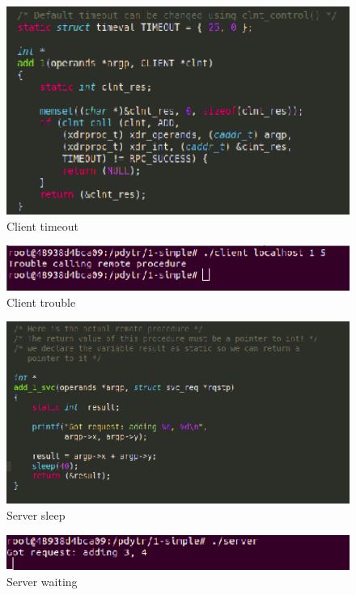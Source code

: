 \documentclass[12pt,journal,compsoc]{IEEEtran}
\begin{document}
\begin{figure}[H]
\centering
\includegraphics[width=125mm]{capturas/client-timeout.png}
\caption{Client timeout}
\label{fig:client-timeout}
\end{figure}

\begin{figure}[H]
\centering
\includegraphics[width=125mm]{capturas/client-trouble.png}
\caption{Client trouble}
\label{fig:client-trouble}
\end{figure}

\begin{figure}[H]
\centering
\includegraphics[width=125mm]{capturas/server-sleep.png}
\caption{Server sleep}
\label{fig:server-sleep}
\end{figure}

\begin{figure}[H]
\centering
\includegraphics[width=125mm]{capturas/server-waiting.png}
\caption{Server waiting}
\label{fig:server-waiting}
\end{figure}
\end{document}
